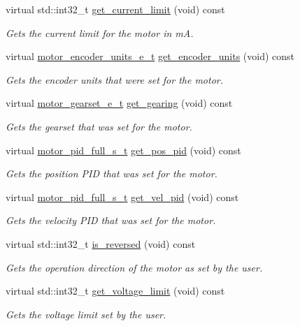 \begin{DoxyCompactItemize}
virtual std\+::int32\+\_\+t \mbox{\hyperlink{classpros_1_1Motor_ad2eafcdf16ed480ddcbb80a45b19c01a}{get\+\_\+current\+\_\+limit}} (void) const
\begin{DoxyCompactList}\small\item\em Gets the current limit for the motor in mA. \end{DoxyCompactList}\item 
virtual \mbox{\hyperlink{motors_8h_a6677ba23760c558fd8b7b4e1e00a6123}{motor\+\_\+encoder\+\_\+units\+\_\+e\+\_\+t}} \mbox{\hyperlink{classpros_1_1Motor_a9fd37f3efa2f903bda8bf575b0052fd2}{get\+\_\+encoder\+\_\+units}} (void) const
\begin{DoxyCompactList}\small\item\em Gets the encoder units that were set for the motor. \end{DoxyCompactList}\item 
virtual \mbox{\hyperlink{motors_8h_aa2f1c305c998abc3bf8dd1f76fa4da8b}{motor\+\_\+gearset\+\_\+e\+\_\+t}} \mbox{\hyperlink{classpros_1_1Motor_a3227bc4fbe531638472fff4dfb134333}{get\+\_\+gearing}} (void) const
\begin{DoxyCompactList}\small\item\em Gets the gearset that was set for the motor. \end{DoxyCompactList}\item 
virtual \mbox{\hyperlink{motors_8h_a0295cbf49f5c70c17b5fa962bd25febd}{motor\+\_\+pid\+\_\+full\+\_\+s\+\_\+t}} \mbox{\hyperlink{classpros_1_1Motor_a32193b8d020ad1b47e1cb9f0b74a6c7d}{get\+\_\+pos\+\_\+pid}} (void) const
\begin{DoxyCompactList}\small\item\em Gets the position P\+ID that was set for the motor. \end{DoxyCompactList}\item 
virtual \mbox{\hyperlink{motors_8h_a0295cbf49f5c70c17b5fa962bd25febd}{motor\+\_\+pid\+\_\+full\+\_\+s\+\_\+t}} \mbox{\hyperlink{classpros_1_1Motor_a2b939563c3b915d7b8ce3dd1dece6208}{get\+\_\+vel\+\_\+pid}} (void) const
\begin{DoxyCompactList}\small\item\em Gets the velocity P\+ID that was set for the motor. \end{DoxyCompactList}\item 
virtual std\+::int32\+\_\+t \mbox{\hyperlink{classpros_1_1Motor_a5122faa60ef7745761eca847192560c5}{is\+\_\+reversed}} (void) const
\begin{DoxyCompactList}\small\item\em Gets the operation direction of the motor as set by the user. \end{DoxyCompactList}\item 
virtual std\+::int32\+\_\+t \mbox{\hyperlink{classpros_1_1Motor_a2afbe15bed764ca6d21f1e7c6c8da700}{get\+\_\+voltage\+\_\+limit}} (void) const
\begin{DoxyCompactList}\small\item\em Gets the voltage limit set by the user. \end{DoxyCompactList}\end{DoxyCompactItemize}
